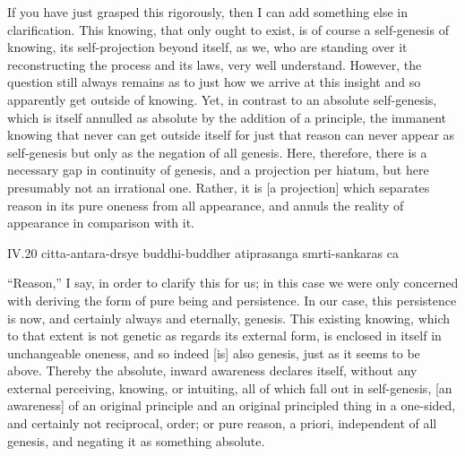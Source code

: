 If you have just grasped this rigorously,
then I can add something else in clarification.
This knowing, that only ought to exist, is of course
a self-genesis of knowing, its self-projection beyond itself,
as we, who are standing over it reconstructing
the process and its laws, very well understand.
However, the question still always remains as
to just how we arrive at this insight
and so apparently get outside of knowing.
Yet, in contrast to an absolute self-genesis,
which is itself annulled as absolute
by the addition of a principle,
the immanent knowing that never can get outside itself
for just that reason can never appear as self-genesis
but only as the negation of all genesis.
Here, therefore, there is a necessary gap
in continuity of genesis,
and a projection per hiatum,
but here presumably not an irrational one.
Rather, it is [a projection] which separates
reason in its pure oneness from all appearance,
and annuls the reality of appearance in comparison with it.

IV.20
citta-antara-drsye buddhi-buddher atiprasanga smrti-sankaras ca

“Reason,” I say, in order to clarify this for us;
in this case we were only concerned with deriving
the form of pure being and persistence.
In our case, this persistence is now,
and certainly always and eternally, genesis.
This existing knowing, which to that extent
is not genetic as regards its external form,
is enclosed in itself in unchangeable oneness,
and so indeed [is] also genesis,
just as it seems to be above.
Thereby the absolute, inward awareness declares itself,
without any external perceiving, knowing, or intuiting,
all of which fall out in self-genesis,
[an awareness] of an original principle
and an original principled thing
in a one-sided, and certainly not reciprocal, order;
or pure reason, a priori,
independent of all genesis,
and negating it as something absolute.

